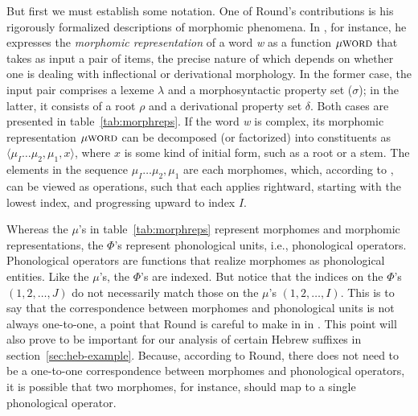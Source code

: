   But first we must establish some notation. 
  One of Round's contributions is his rigorously formalized descriptions of 
  morphomic phenomena. In \citet{round:2011}, for instance, 
  he expresses the \emph{morphomic representation} of a word 
  \textit{w} as a function $\mu{\textsc{word}}$ that 
  takes as input a pair of items, the precise nature
  of which depends on whether one is dealing with inflectional or 
  derivational morphology. In the former case, the input pair comprises 
  a lexeme $\lambda$ and a morphosyntactic property set ($\sigma$); in the latter, 
  it consists of a root $\rho$ and a derivational property set $\delta$. 
  Both cases are presented in table~\ref{tab:morphreps}. If the word \textit{w} 
 is complex, its morphomic representation $\mu{\textsc{word}}$ 
  can be decomposed (or factorized) into constituents as  
  $\langle  \mu_{I} \dots \mu_{2}, \mu_{1}, x \rangle$, where $x$ 
  is some kind of initial form, such as a root or a stem. The elements in the sequence 
  $ \mu_{I} \dots \mu_{2}, \mu_{1}$ are each morphomes, 
  which, according to \citet{round:2015}, can be viewed as operations, 
  such that each applies rightward, starting with the lowest index, and progressing upward
  to index $I$.
  
  Whereas the $\mu$'s in table~\ref{tab:morphreps} represent 
  morphomes and morphomic representations, the $\Phi$'s represent 
  phonological units, i.e., phonological operators. Phonological operators are functions that realize morphomes as phonological entities. 
  Like the $\mu$'s, 
  the $\Phi$'s are indexed. But notice that the  indices on the $\Phi$'s $(1,2,\dots,J)$ 
  do not necessarily match those on the $\mu$'s $(1,2,\dots,I)$. This is to say that
the correspondence between 
  morphomes and phonological units is not always one-to-one, a point that Round is careful to make in 
  in \cite{round:2015}. This point
  will also prove to be important for our analysis of certain Hebrew 
  suffixes in section~\ref{sec:heb-example}. Because, according to Round, there does not need to be a one-to-one correspondence between morphomes and phonological operators, it is possible that two morphomes, for instance, should map to a single phonological operator. 

